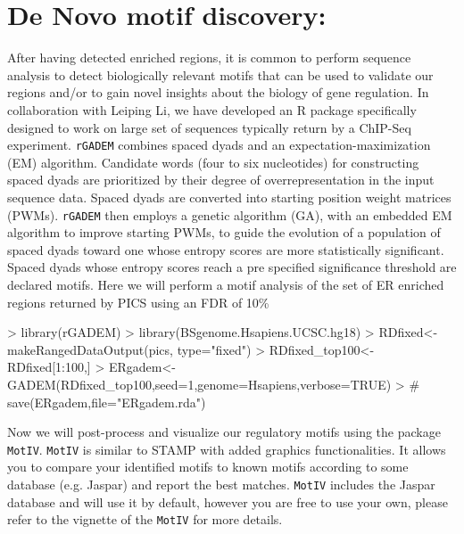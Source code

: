\documentclass[12pt]{article}
\newcommand{\Rpackage}[1]{\texttt{#1}}
\begin{document}
\section{De Novo motif discovery:}
After having detected enriched regions, it is common to perform sequence analysis to detect biologically 
relevant motifs that can be used to validate our regions and/or to gain novel insights about the biology of gene regulation. In collaboration with Leiping Li, we have developed an R package specifically designed to work on large set of sequences typically return by a ChIP-Seq experiment. \Rpackage{rGADEM} combines spaced dyads and an expectation-maximization (EM) algorithm. Candidate words (four to six nucleotides) for constructing spaced dyads are prioritized by their degree of overrepresentation in the input sequence data. Spaced dyads are converted into starting position weight matrices (PWMs). \Rpackage{rGADEM} then employs a genetic algorithm (GA), with an embedded EM algorithm to improve starting PWMs, to guide the evolution of a population of spaced dyads toward one whose entropy scores are more statistically significant. Spaced dyads whose entropy scores reach a pre specified significance threshold are declared motifs. 
Here we will perform a motif analysis of the set of ER enriched regions returned by PICS using an FDR of 10\%

\begin{Schunk}
\begin{Sinput}
> library(rGADEM)
> library(BSgenome.Hsapiens.UCSC.hg18)
> RDfixed<-makeRangedDataOutput(pics, type="fixed")
> RDfixed_top100<-RDfixed[1:100,]
> ERgadem<-GADEM(RDfixed_top100,seed=1,genome=Hsapiens,verbose=TRUE)
> # save(ERgadem,file="ERgadem.rda")
\end{Sinput}
\end{Schunk}

Now we will post-process and visualize our regulatory motifs using the package \Rpackage{MotIV}. \Rpackage{MotIV} is similar to STAMP \cite{Mahony:2007p125} with added graphics functionalities. It allows you to compare your identified motifs to known motifs according to some database (e.g. Jaspar\cite{PortalesCasamar:2010p543}) and report the best matches. \Rpackage{MotIV} includes the Jaspar database and will use it by default, however you are free to use your own, please refer to the vignette of the \Rpackage{MotIV} for more details.
\end{document}
